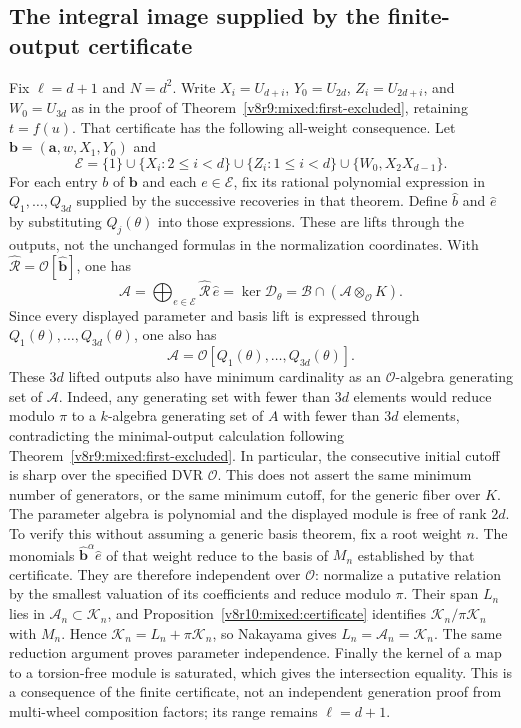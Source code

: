 \documentclass[10pt,fleqn]{article}
\numberwithin{equation}{section}
\begin{document}
\subsection{The integral image supplied by the finite-output certificate}
\label{r17:mixed:integral-lift}

Fix $\ell=d+1$ and $N=d^2$.  Write $X_i=U_{d+i}$,
$Y_0=U_{2d}$, $Z_i=U_{2d+i}$, and $W_0=U_{3d}$ as in the proof of
Theorem~\ref{v8r9:mixed:first-excluded}, retaining $t=f(u)$.
That certificate has the following all-weight consequence.  Let $\mathbf b=(\mathbf a,w,X_1,Y_0)$ and
\[
 \mathcal E=\{1\}\cup\{X_i:2\le i<d\}
  \cup\{Z_i:1\le i<d\}\cup\{W_0,X_2X_{d-1}\}.
\]
For each entry $b$ of $\mathbf b$ and each $e\in\mathcal E$, fix its
rational polynomial expression in $Q_1,\ldots,Q_{3d}$ supplied by the
successive recoveries in that theorem.  Define $\widehat b$ and
$\widehat e$ by substituting $Q_j(\theta)$ into those expressions.
These are lifts through the outputs, not the unchanged formulas in the
normalization coordinates.  With
$\widehat{\mathcal R}=\mathcal O[\widehat{\mathbf b}]$, one has
\[
 \mathcal A=\bigoplus_{e\in\mathcal E}
       \widehat{\mathcal R}\,\widehat e
   =\ker\mathcal D_\theta
   =\mathcal B\cap(\mathcal A\otimes_{\mathcal O}K).
\]
Since every displayed parameter and basis lift is expressed through
$Q_1(\theta),\ldots,Q_{3d}(\theta)$, one also has
\[
 \mathcal A=\mathcal O[Q_1(\theta),\ldots,Q_{3d}(\theta)].
\]
These $3d$ lifted outputs also have minimum cardinality as an
$\mathcal O$-algebra generating set of $\mathcal A$.  Indeed, any generating
set with fewer than $3d$ elements would reduce modulo $\pi$ to a
$k$-algebra generating set of $A$ with fewer than $3d$ elements, contradicting
the minimal-output calculation following
Theorem~\ref{v8r9:mixed:first-excluded}.  In particular, the consecutive
initial cutoff is sharp over the specified DVR $\mathcal O$.  This does not
assert the same minimum number of generators, or the same minimum cutoff,
for the generic fiber over $K$.
The parameter algebra is polynomial and the displayed module is free of
rank $2d$.  To verify this without assuming a generic basis theorem,
fix a root weight $n$.  The monomials
$\widehat{\mathbf b}^{\alpha}\widehat e$ of that weight reduce to the
basis of $M_n$ established by that certificate.  They are therefore independent over
$\mathcal O$: normalize a putative relation by the smallest valuation
of its coefficients and reduce modulo $\pi$.
Their span $L_n$ lies in $\mathcal A_n\subset\mathcal K_n$, and
Proposition~\ref{v8r10:mixed:certificate} identifies
$\mathcal K_n/\pi\mathcal K_n$ with $M_n$.  Hence
$\mathcal K_n=L_n+\pi\mathcal K_n$, so Nakayama gives
$L_n=\mathcal A_n=\mathcal K_n$.
The same reduction argument proves parameter independence.
Finally the kernel of a map to a torsion-free module is saturated,
which gives the intersection equality.  This is a consequence of the finite certificate, not an independent
generation proof from multi-wheel composition factors; its range remains
$\ell=d+1$.
\end{document}
